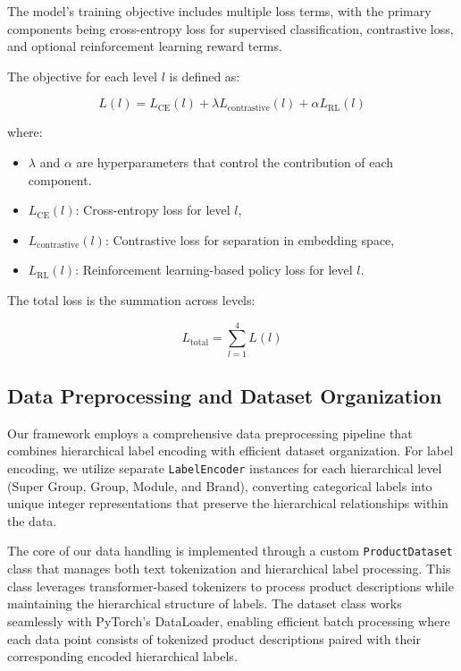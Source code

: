 \documentclass[9pt,a4paper,twoside]{rho-class/rho}
\begin{document}
The model’s training objective includes multiple loss terms, with the primary components being cross-entropy loss for supervised classification, contrastive loss, and optional reinforcement learning reward terms.

The objective for each level \( l \) is defined as:

\[ \label{eq:level_loss}
L(l) = L_{\text{CE}}(l) + \lambda L_{\text{contrastive}}(l) + \alpha L_{\text{RL}}(l)
\]

where:
\begin{itemize}
    \item \( \lambda \) and \( \alpha \) are hyperparameters that control the contribution of each component.
    \item \( L_{\text{CE}}(l) \): Cross-entropy loss for level \( l \),
    \item \( L_{\text{contrastive}}(l) \): Contrastive loss for separation in embedding space,
    \item \( L_{\text{RL}}(l) \): Reinforcement learning-based policy loss for level \( l \).
\end{itemize}

The total loss is the summation across levels:

\[ \label{eq:total_loss}
L_{\text{total}} = \sum_{l=1}^{4} L(l)
\]

        
    \subsection{Data Preprocessing and Dataset Organization}

       Our framework employs a comprehensive data preprocessing pipeline that combines hierarchical label encoding with efficient dataset organization. For label encoding, we utilize separate \verb|LabelEncoder| instances for each hierarchical level (Super Group, Group, Module, and Brand), converting categorical labels into unique integer representations that preserve the hierarchical relationships within the data.

The core of our data handling is implemented through a custom \verb|ProductDataset| class that manages both text tokenization and hierarchical label processing. This class leverages transformer-based tokenizers to process product descriptions while maintaining the hierarchical structure of labels. The dataset class works seamlessly with PyTorch's DataLoader, enabling efficient batch processing where each data point consists of tokenized product descriptions paired with their corresponding encoded hierarchical labels.
\end{document}
